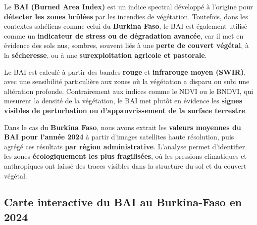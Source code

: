 \documentclass[
]{book}
\begin{document}
Le \textbf{BAI (Burned Area Index)} est un indice spectral développé à l'origine pour \textbf{détecter les zones brûlées} par les incendies de végétation. Toutefois, dans les contextes sahéliens comme celui du \textbf{Burkina Faso}, le BAI est également utilisé comme un \textbf{indicateur de stress ou de dégradation avancée}, car il met en évidence des sols nus, sombres, souvent liés à une \textbf{perte de couvert végétal}, à la \textbf{sécheresse}, ou à une \textbf{surexploitation agricole et pastorale}.

Le BAI est calculé à partir des bandes \textbf{rouge} et \textbf{infrarouge moyen (SWIR)}, avec une sensibilité particulière aux zones où la végétation a disparu ou subi une altération profonde. Contrairement aux indices comme le NDVI ou le BNDVI, qui mesurent la densité de la végétation, le BAI met plutôt en évidence les \textbf{signes visibles de perturbation ou d'appauvrissement de la surface terrestre}.

Dans le cas du \textbf{Burkina Faso}, nous avons extrait les \textbf{valeurs moyennes du BAI pour l'année 2024} à partir d'images satellites haute résolution, puis agrégé ces résultats \textbf{par région administrative}. L'analyse permet d'identifier les zones \textbf{écologiquement les plus fragilisées}, où les pressions climatiques et anthropiques ont laissé des traces visibles dans la structure du sol et du couvert végétal.

\subsection{Carte interactive du BAI au Burkina-Faso en 2024}\label{carte-interactive-du-bai-au-burkina-faso-en-2024}
\end{document}
